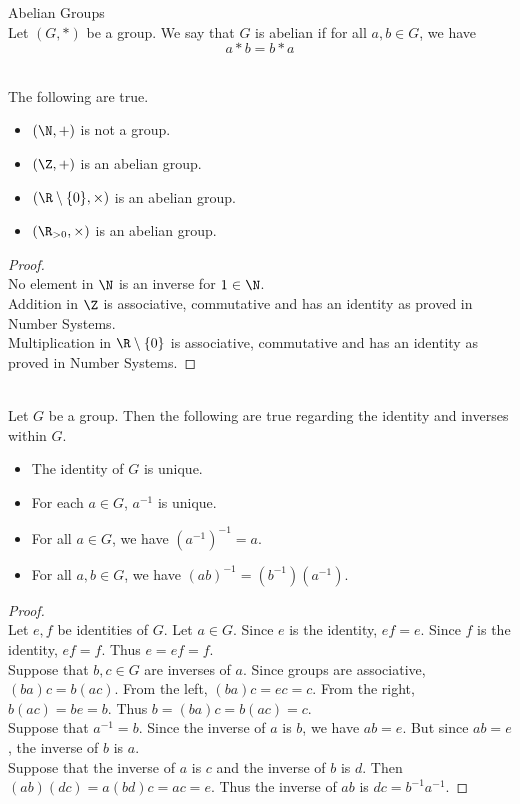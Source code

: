 \documentclass[a4paper]{article}
\begin{document}
\begin{defn}{Abelian Groups}{}\\
Let $(G,\ast)$ be a group. We say that $G$ is abelian if for all $a,b\in G$, we have $$a\ast b=b\ast a$$
\end{defn}

\begin{eg}{}{}\\
The following are true. 
\begin{itemize}
\item $(\N,+)$ is not a group. 
\item $(\Z,+)$ is an abelian group. 
\item $(\R\setminus\{0\},\times)$ is an abelian group. 
\item $(\R_{>0},\times)$ is an abelian group. 
\end{itemize}
\begin{proof}\\
No element in $\N$ is an inverse for $1\in\N$. \\

Addition in $\Z$ is associative, commutative and has an identity as proved in Number Systems. \\

Multiplication in $\R\setminus\{0\}$ is associative, commutative and has an identity as proved in Number Systems. 
\end{proof}
\end{eg}

\begin{lmm}{}{}\\
Let $G$ be a group. Then the following are true regarding the identity and inverses within $G$. 
\begin{itemize}
\item The identity of $G$ is unique. 
\item For each $a\in G$, $a^{-1}$ is unique. 
\item For all $a\in G$, we have $(a^{-1})^{-1}=a$. 
\item For all $a,b\in G$, we have $(ab)^{-1}=(b^{-1})(a^{-1})$. 
\end{itemize}
\begin{proof}\\
Let $e,f$ be identities of $G$. Let $a\in G$. Since $e$ is the identity, $ef=e$. Since $f$ is the identity, $ef=f$. Thus $e=ef=f$. \\

Suppose that $b,c\in G$ are inverses of $a$. Since groups are associative, $(ba)c=b(ac)$. From the left, $(ba)c=ec=c$. From the right, $b(ac)=be=b$. Thus $b=(ba)c=b(ac)=c$. \\

Suppose that $a^{-1}=b$. Since the inverse of $a$ is $b$, we have $ab=e$. But since $ab=e$, the inverse of $b$ is $a$. \\

Suppose that the inverse of $a$ is $c$ and the inverse of $b$ is $d$. Then $(ab)(dc)=a(bd)c=ac=e$. Thus the inverse of $ab$ is $dc=b^{-1}a^{-1}$. 
\end{proof}
\end{lmm}
\end{document}
